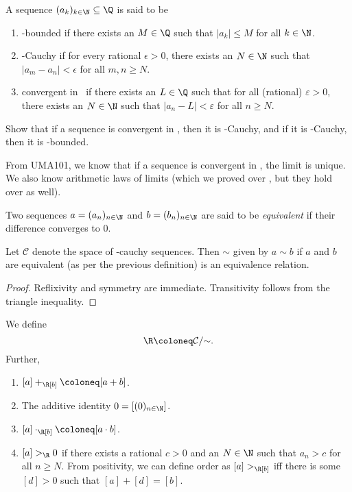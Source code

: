 \begin{definition}
    A sequence $(a_k)_{k \in \N} \subseteq \Q$ is said to be
    \begin{enumerate}
        \item \Q-bounded if there exists an $M \in \Q$ such that
        $|a_k| \le M$ for all $k \in \N$.
        \item \Q-Cauchy if for every rational $\epsilon > 0$, there exists
        an $N \in \N$ such that $|a_m - a_n| < \epsilon$ for all
        $m, n \ge N$.
        \item convergent in \Q\ if there exists an $L \in \Q$ such that
        for all (rational) $\varepsilon > 0$, there exists an $N \in \N$
        such that $|a_n - L| < \varepsilon$ for all $n \ge N$.
    \end{enumerate}
\end{definition}

\begin{exercise}
    Show that if a sequence is convergent in \Q, then it is \Q-Cauchy,
    and if it is \Q-Cauchy, then it is \Q-bounded.
\end{exercise}
\begin{remark}
    From UMA101, we know that if a sequence is convergent in \Q, the limit
    is unique.
    We also know arithmetic laws of limits (which we proved over \R, but
    they hold over \Q as well).
\end{remark}

\begin{definition}
    Two sequences $a = (a_n)_{n \in \N}$ and $b = (b_n)_{n \in \N}$ are said
    to be \emph{equivalent} if their difference converges to $0$.
\end{definition}

\begin{proposition}
    Let $\mathcal{C}$ denote the space of \Q-cauchy sequences.
    Then $\sim$ given by $a \sim b$ if $a$ and $b$ are equivalent (as per
    the previous definition) is an equivalence relation.
\end{proposition}
\begin{proof}
    Reflixivity and symmetry are immediate.
    Transitivity follows from the triangle inequality.
\end{proof}

\begin{definition}[\R] \label{def:R:cauchy}
    We define \[
        \R \coloneq \mathcal{C} /{\sim}.
    \] Further,
    \begin{enumerate}
        \item $[a] +_\R [b] \coloneq [a + b]$.
        \item The additive identity $0 = [(0)_{n \in \N}]$.
        \item $[a] \cdot_\R [b] \coloneq [a \cdot b]$.
        \item $[a] >_\R 0$ if there exists a rational $c > 0$ and an
        $N \in \N$ such that $a_n > c$ for all $n \ge N$.
        From positivity, we can define order as $[a] >_\R [b]$ iff there
        is some $[d] > 0$ such that $[a] + [d] = [b]$.
    \end{enumerate}
\end{definition}
